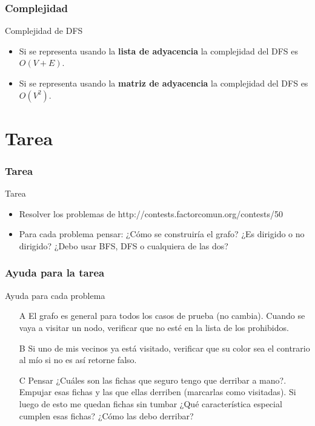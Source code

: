 \documentclass{beamer}
\begin{document}
	\begin{frame}
		\frametitle{Complejidad}
		\begin{block}{Complejidad de DFS}
			\begin{itemize}
				\item Si se representa usando la \textbf{lista
de adyacencia} la complejidad del DFS es $O(V+E)$.
				\item Si se representa usando la \textbf{matriz
de adyacencia} la complejidad del DFS es $O(V^2)$.
			\end{itemize}
		\end{block}
	\end{frame}

\section{Tarea}
	\begin{frame}
		\frametitle{Tarea}
		\begin{alertblock}{Tarea}
			\begin{itemize}
				\item Resolver los problemas de
http://contests.factorcomun.org/contests/50 \\
				\item Para cada problema pensar: ¿Cómo se
construiría el grafo? ¿Es dirigido o no dirigido? ¿Debo usar BFS, DFS o
cualquiera de las dos?
			\end{itemize}
		\end{alertblock}
	\end{frame}

	\begin{frame}
		\frametitle{Ayuda para la tarea}
		\begin{exampleblock}{Ayuda para cada problema}
			\begin{itemize}
				\item[A] El grafo es general para todos los
casos de prueba (no cambia). Cuando se vaya a visitar un nodo, verificar que no
esté en la lista de los prohibidos.
				\item[B] Si uno de mis vecinos ya está visitado,
verificar que su color sea el contrario al mío si no es así retorne falso.
				\item[C] Pensar ¿Cuáles son las fichas que
seguro tengo que derribar a mano?. Empujar esas fichas y las que ellas derriben
(marcarlas como visitadas). Si luego de esto me quedan fichas sin tumbar ¿Qué
característica especial cumplen esas fichas? ¿Cómo las debo derribar?
			\end{itemize}
		\end{exampleblock}
	\end{frame}
\end{document}
